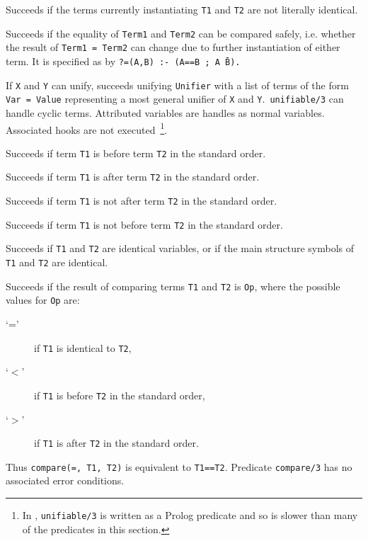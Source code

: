 \begin{description}
  
    Succeeds if the terms currently instantiating {\tt T1} and {\tt T2}
    are not literally identical.

%
Succeeds if the equality of {\tt Term1} and {\tt Term2} can be
compared safely, i.e. whether the result of {\tt Term1 = Term2} can
change due to further instantiation of either term. It is specified as
by {\tt ?=(A,B) :- (A==B ; A \= B).} 

%
If {\tt X} and {\tt Y} can unify, succeeds unifying {\tt Unifier} with
a list of terms of the form {\tt Var = Value} representing a most
general unifier of {\tt X} and {\tt Y}.\  {\tt unifiable/3} can handle
cyclic terms. Attributed variables are handles as normal
variables. Associated hooks are not executed~\footnote{In \version ,
  {\tt unifiable/3} is written as a Prolog predicate and so is slower
  than many of the predicates in this section.}.

    Succeeds if term {\tt T1} is before term {\tt T2} in the standard order.

    Succeeds if term {\tt T1} is after term {\tt T2} in the standard order.

    Succeeds if term {\tt T1} is not after term {\tt T2} in the standard order.

    Succeeds if term {\tt T1} is not before term {\tt T2} in the standard order.

    Succeeds if {\tt T1} and {\tt T2} are identical variables, or if
    the main structure symbols of {\tt T1} and {\tt T2} are identical.

    Succeeds if the result of comparing terms {\tt T1} and {\tt T2} 
    is {\tt Op}, where the possible values for {\tt Op} are:
    \begin{description}
    \item[`='] if {\tt T1} is identical to {\tt T2},
    \item[`$<$'] if {\tt T1} is before {\tt T2} in the standard order,
    \item[`$>$'] if {\tt T1} is after {\tt T2} in the standard order.
    \end{description}
    Thus {\tt compare(=, T1, T2)} is equivalent to {\tt T1==T2}.
    Predicate {\tt compare/3} has no associated error conditions.


\end{description}
